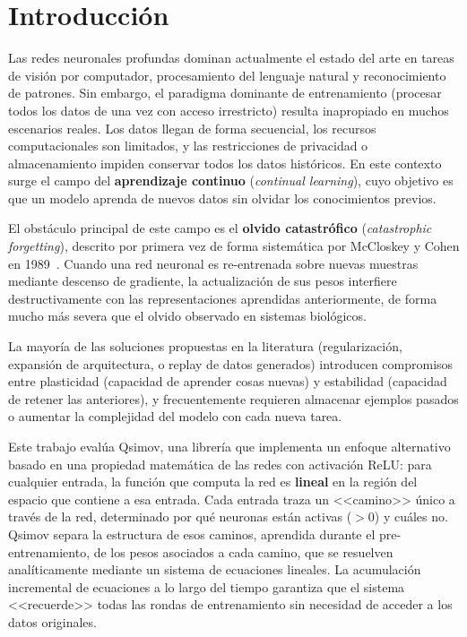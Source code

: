 
\section{Introducción}

Las redes neuronales profundas dominan actualmente el estado del arte en tareas de visión por
computador, procesamiento del lenguaje natural y reconocimiento de patrones. Sin embargo, el
paradigma dominante de entrenamiento (procesar todos los datos de una vez con acceso
irrestricto) resulta inapropiado en muchos escenarios reales. Los datos llegan de forma
secuencial, los recursos computacionales son limitados, y las restricciones de privacidad o
almacenamiento impiden conservar todos los datos históricos. En este contexto surge el campo del
\textbf{aprendizaje continuo} (\textit{continual learning}), cuyo objetivo es que un modelo aprenda
de nuevos datos sin olvidar los conocimientos previos.

El obstáculo principal de este campo es el \textbf{olvido catastrófico}
(\textit{catastrophic forgetting}), descrito por primera vez de forma sistemática por McCloskey y
Cohen en 1989~\cite{ref1}. Cuando una red neuronal es re-entrenada sobre nuevas muestras mediante
descenso de gradiente, la actualización de sus pesos interfiere destructivamente con las
representaciones aprendidas anteriormente, de forma mucho más severa que el olvido observado en
sistemas biológicos.

La mayoría de las soluciones propuestas en la literatura (regularización, expansión de
arquitectura, o replay de datos generados) introducen compromisos entre plasticidad (capacidad de
aprender cosas nuevas) y estabilidad (capacidad de retener las anteriores), y frecuentemente
requieren almacenar ejemplos pasados o aumentar la complejidad del modelo con cada nueva tarea.

Este trabajo evalúa Qsimov, una librería que implementa un enfoque alternativo basado en una
propiedad matemática de las redes con activación ReLU: para cualquier entrada, la función que
computa la red es \textbf{lineal} en la región del espacio que contiene a esa entrada. Cada entrada
traza un <<camino>> único a través de la red, determinado por qué neuronas están activas ($> 0$) y
cuáles no. Qsimov separa la estructura de esos caminos, aprendida durante el pre-entrenamiento,
de los pesos asociados a cada camino, que se resuelven analíticamente mediante un sistema de
ecuaciones lineales. La acumulación incremental de ecuaciones a lo largo del tiempo garantiza que el
sistema <<recuerde>> todas las rondas de entrenamiento sin necesidad de acceder a los datos
originales.

